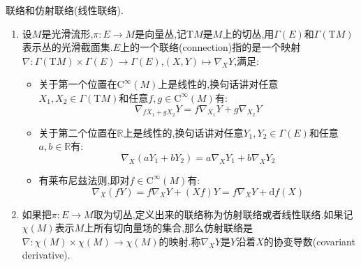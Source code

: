 联络和仿射联络(线性联络).
\begin{enumerate}
	\item 设$M$是光滑流形,$\pi:E\to M$是向量丛,记$\mathrm{T}M$是$M$上的切丛,用$\Gamma(E)$和$\Gamma(\mathrm{T}M)$表示丛的光滑截面集.$E$上的一个联络(connection)指的是一个映射$\nabla:\Gamma(\mathrm{T}M)\times\Gamma(E)\to\Gamma(E)$,$(X,Y)\mapsto\nabla_XY$,满足:
	\begin{itemize}
		\item 关于第一个位置在$\mathrm{C}^{\infty}(M)$上是线性的,换句话讲对任意$X_1,X_2\in\Gamma(\mathrm{T}M)$和任意$f,g\in\mathrm{C}^{\infty}(M)$有:
		$$\nabla_{fX_1+gX_2}Y=f\nabla_{X_1}Y+g\nabla_{X_2}Y$$
		\item 关于第二个位置在$\mathbb{R}$上是线性的,换句话讲对任意$Y_1,Y_2\in\Gamma(E)$和任意$a,b\in\mathbb{R}$有:
		$$\nabla_X(aY_1+bY_2)=a\nabla_XY_1+b\nabla_XY_2$$
		\item 有莱布尼兹法则,即对$f\in\mathrm{C}^{\infty}(M)$有:
		$$\nabla_X(fY)=f\nabla_XY+(Xf)Y=f\nabla_XY+\mathrm{d}f(X)$$
	\end{itemize}
    \item 如果把$\pi:E\to M$取为切丛,定义出来的联络称为仿射联络或者线性联络.如果记$\chi(M)$表示$M$上所有切向量场的集合,那么仿射联络是$\nabla:\chi(M)\times\chi(M)\to\chi(M)$的映射.称$\nabla_XY$是$Y$沿着$X$的协变导数(covariant derivative).
\end{enumerate}
